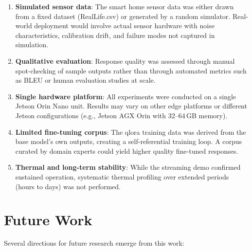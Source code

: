 \documentclass[12pt,a4paper,oneside]{report}
\begin{document}
\begin{enumerate}
    \item \textbf{Simulated sensor data}: The smart home sensor data was either drawn from a fixed dataset (RealLife.csv) or generated by a random simulator. Real-world deployment would involve actual sensor hardware with noise characteristics, calibration drift, and failure modes not captured in simulation.

    \item \textbf{Qualitative evaluation}: Response quality was assessed through manual spot-checking of sample outputs rather than through automated metrics such as BLEU or human evaluation studies at scale.

    \item \textbf{Single hardware platform}: All experiments were conducted on a single Jetson Orin Nano unit. Results may vary on other edge platforms or different Jetson configurations (e.g., Jetson AGX Orin with 32--64\,GB memory).

    \item \textbf{Limited fine-tuning corpus}: The \gls{qlora} training data was derived from the base model's own outputs, creating a self-referential training loop. A corpus curated by domain experts could yield higher quality fine-tuned responses.

    \item \textbf{Thermal and long-term stability}: While the streaming demo confirmed sustained operation, systematic thermal profiling over extended periods (hours to days) was not performed.
\end{enumerate}


\section{Future Work}
\label{sec:conc-future}

Several directions for future research emerge from this work:
\end{document}
